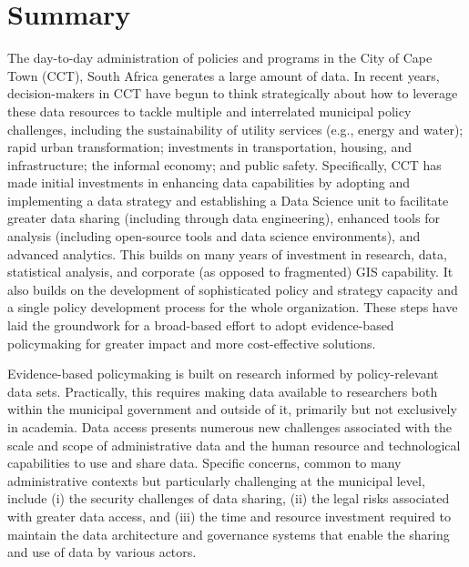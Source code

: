 \documentclass[11pt]{book}
\begin{document}
\section{Summary}

The day-to-day administration of policies and programs in the City of Cape Town (CCT), South Africa generates a large amount of data. In recent years, decision-makers in CCT have begun to think strategically about how to leverage these data resources to tackle multiple and interrelated municipal policy challenges, including the sustainability of utility services (e.g., energy and water); rapid urban transformation; investments in transportation, housing, and infrastructure; the informal economy; and public safety. Specifically, CCT has made initial investments in enhancing data capabilities by adopting and implementing a data strategy and establishing a Data Science unit to facilitate greater data sharing (including through data engineering), enhanced tools for analysis (including open-source tools and data science environments), and advanced analytics. This builds on many years of investment in research, data, statistical analysis, and corporate (as opposed to fragmented) GIS capability. It also builds on the development of sophisticated policy and strategy capacity and a single policy development process for the whole organization. These steps have laid the groundwork for a broad-based effort to adopt evidence-based policymaking for greater impact and more cost-effective solutions.

Evidence-based policymaking is built on research informed by policy-relevant data sets. Practically, this requires making data available to researchers both within the municipal government and outside of it, primarily but not exclusively in academia. Data access presents numerous new challenges associated with the scale and scope of administrative data and the human resource and technological capabilities to use and share data. Specific concerns, common to many administrative contexts but particularly challenging at the municipal level, include (i) the security challenges of data sharing, (ii) the legal risks associated with greater data access, and (iii) the time and resource investment required to maintain the data architecture and governance systems that enable the sharing and use of data by various actors.
\end{document}
